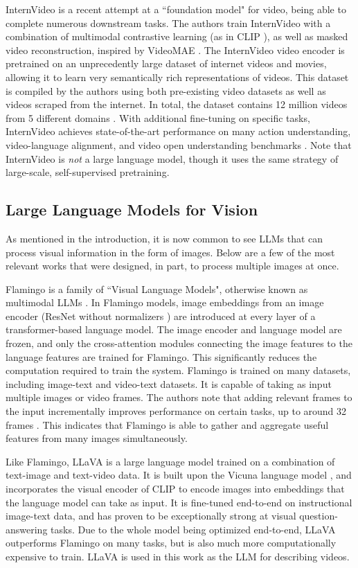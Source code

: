 InternVideo is a recent attempt at a ``foundation model" for video, being able to complete numerous downstream tasks.
The authors train InternVideo with a combination of multimodal contrastive learning (as in CLIP \cite{clip}), as well as masked video reconstruction, inspired by VideoMAE \cite{videomae}.
The InternVideo video encoder is pretrained on an unprecedently large dataset of internet videos and movies, allowing it to learn very semantically rich representations of videos.
This dataset is compiled by the authors using both pre-existing video datasets as well as videos scraped from the internet. In total, the dataset contains 12 million videos from 5 different domains \cite{internvideo}.
With additional fine-tuning on specific tasks, InternVideo achieves state-of-the-art performance on many action understanding, video-language alignment, and video open understanding benchmarks \cite{internvideo}.
Note that InternVideo is \textit{not} a large language model, though it uses the same strategy of large-scale, self-supervised pretraining.

\subsection{Large Language Models for Vision}

As mentioned in the introduction, it is now common to see LLMs that can process visual information in the form of images. 
Below are a few of the most relevant works that were designed, in part, to process multiple images at once.

Flamingo is a family of ``Visual Language Models", otherwise known as multimodal LLMs \cite{flamingo}.
In Flamingo models, image embeddings from an image encoder (ResNet without normalizers \cite{nfnet}) are introduced at every layer of a transformer-based language model.
The image encoder and language model are frozen, and only the cross-attention modules connecting the image features to the language features are trained for Flamingo.
This significantly reduces the computation required to train the system.
Flamingo is trained on many datasets, including image-text and video-text datasets. It is capable of taking as input multiple images or video frames. 
The authors note that adding relevant frames to the input incrementally improves performance on certain tasks, up to around 32 frames \cite{flamingo}.
This indicates that Flamingo is able to gather and aggregate useful features from many images simultaneously.

Like Flamingo, LLaVA \cite{llava} is a large language model trained on a combination of text-image and text-video data.
It is built upon the Vicuna language model \cite{vicuna}, and incorporates the visual encoder of CLIP \cite{clip} to encode images into embeddings that the language model can take as input.
It is fine-tuned end-to-end on instructional image-text data, and has proven to be exceptionally strong at visual question-answering tasks.
Due to the whole model being optimized end-to-end, LLaVA outperforms Flamingo on many tasks, but is also much more computationally expensive to train.
LLaVA is used in this work as the LLM for describing videos.

